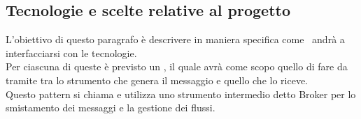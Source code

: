 %	
%	

\subsection{Tecnologie e scelte relative al progetto}
	L'obiettivo di questo paragrafo è descrivere in maniera specifica come \progetto\ andrà a interfacciarsi con le tecnologie.\\
	Per ciascuna di queste è previsto un , il quale avrà come scopo quello di fare da tramite tra lo strumento che genera il messaggio e quello che lo riceve.\\
	Questo pattern si chiama  e utilizza uno strumento intermedio detto Broker per lo smistamento dei messaggi e la gestione dei flussi.

